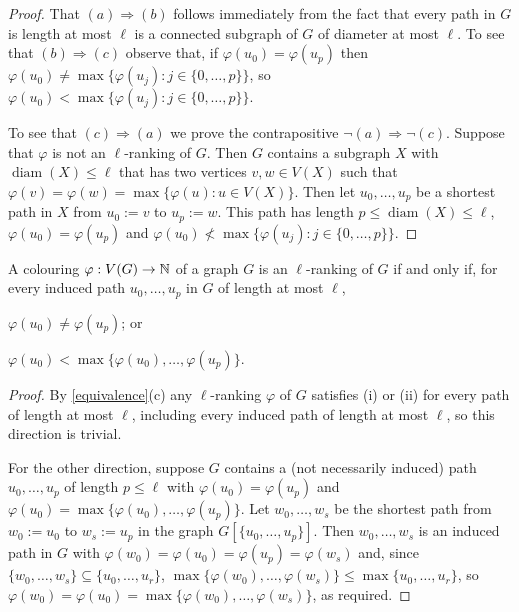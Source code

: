\documentclass[kpfonts]{patmorin}
\DeclareMathOperator{\diam}{diam}
\theoremstyle{named}
\begin{document}
\begin{proof}
  That $(a)\Rightarrow (b)$ follows immediately from the fact that every path in $G$ is length at most $\ell$ is a connected subgraph of $G$ of diameter at most $\ell$.  To see that $(b)\Rightarrow(c)$ observe that, if $\varphi(u_0)=\varphi(u_p)$ then $\varphi(u_0)\neq\max\{\varphi(u_j):j\in\{0,\ldots,p\}\}$, so $\varphi(u_0)<\max\{\varphi(u_j):j\in\{0,\ldots,p\}\}$.

  To see that $(c)\Rightarrow (a)$ we prove the contrapositive $\neg(a)\Rightarrow\neg(c)$. Suppose that $\varphi$ is not an $\ell$-ranking of $G$. Then $G$ contains a subgraph $X$ with $\diam(X)\le\ell$ that has two vertices $v,w\in V(X)$ such that $\varphi(v)=\varphi(w)=\max\{\varphi(u):u\in V(X)\}$.  Then let $u_0,\ldots,u_p$ be a shortest path in $X$ from $u_0:=v$ to $u_p:=w$.  This path has length $p\le\diam(X)\le\ell$, $\varphi(u_0)=\varphi(u_p)$ and $\varphi(u_0)\not<\max\{\varphi(u_j):j\in\{0,\ldots,p\}\}$.
\end{proof}


\begin{obs}\label{induced-paths-only}
    A colouring $\varphi:V(G)\to\mathbb{N}$ of a graph $G$ is an $\ell$-ranking of $G$ if and only if, for every induced path $u_0,\ldots,u_p$ in $G$ of length at most $\ell$,
    \begin{inparaenum}[(i)]
        \item $\varphi(u_0)\neq\varphi(u_p)$; or
        \item $\varphi(u_0)<\max\{\varphi(u_0),\ldots,\varphi(u_p)\}$.
    \end{inparaenum}
\end{obs}

\begin{proof}
    By \cref{equivalence}(c) any $\ell$-ranking $\varphi$ of $G$ satisfies (i) or (ii) for every path of length at most $\ell$, including every induced path of length at most $\ell$, so this direction is trivial.

    For the other direction, suppose $G$ contains a (not necessarily induced) path $u_0,\ldots,u_p$ of length $p\le\ell$ with $\varphi(u_0)=\varphi(u_p)$ and $\varphi(u_0)=\max\{\varphi(u_0),\ldots,\varphi(u_p)\}$.  Let $w_0,\ldots,w_s$ be the shortest path from $w_0:=u_0$ to $w_s:=u_p$ in  the graph $G[\{u_0,\ldots,u_p\}]$.  Then $w_0,\ldots,w_s$ is an induced path in $G$ with $\varphi(w_0)=\varphi(u_0)=\varphi(u_p)=\varphi(w_s)$ and, since $\{w_0,\ldots,w_{s}\}\subseteq\{u_0,\ldots,u_{r}\}$, $\max\{\varphi(w_0),\ldots,\varphi(w_{s})\}\le\max\{u_0,\ldots,u_{r}\}$, so $\varphi(w_0)=\varphi(u_0)=\max\{\varphi(w_0),\ldots,\varphi(w_s)\}$, as required.
\end{proof}
\end{document}

